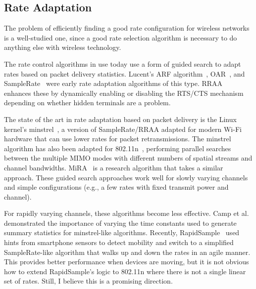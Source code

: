 \subsection{Rate Adaptation}
The problem of efficiently finding a good rate configuration for wireless networks is a well-studied one, since a good rate selection algorithm is necessary to do anything else with wireless technology.

The rate control algorithms in use today use a form of guided search to adapt rates based on packet delivery statistics. Lucent's ARF algorithm~\cite{Kamerman_ARF}, OAR~\cite{Sadeghi_OAR}, and SampleRate~\cite{Bicket_SampleRate} were early rate adaptation algorithms of this type. RRAA~\cite{Wong_RRAA} enhances these by dynamically enabling or disabling the RTS/CTS mechanism depending on whether hidden terminals are a problem.

The state of the art in rate adaptation based on packet delivery is the Linux kernel's minstrel~\cite{minstrel}, a version of SampleRate/RRAA adapted for modern Wi-Fi hardware that can use lower rates for packet retransmissions. The minstrel algorithm has also been adapted for 802.11n~\cite{minstrel_ht}, performing parallel searches between the multiple MIMO modes with different numbers of spatial streams and channel bandwidths. MiRA~\cite{Pefkianakis_MiRA} is a research algorithm that takes a similar approach. These guided search approaches work well for slowly varying channels and simple configurations (e.g., a few rates with fixed transmit power and channel).

For rapidly varying channels, these algorithms become less effective. Camp et al.~\cite{Camp_rateadapt} demonstrated the importance of varying the time constants used to generate summary statistics for minstrel-like algorithms. Recently, RapidSample~\cite{Ravindranath_SensorHints} used hints from smartphone sensors to detect mobility and switch to a simplified SampleRate-like algorithm that walks up and down the rates in an agile manner. This provides better performance when devices are moving, but it is not obvious how to extend RapidSample's logic to 802.11n where there is not a single linear set of rates. Still, I believe this is a promising direction.

